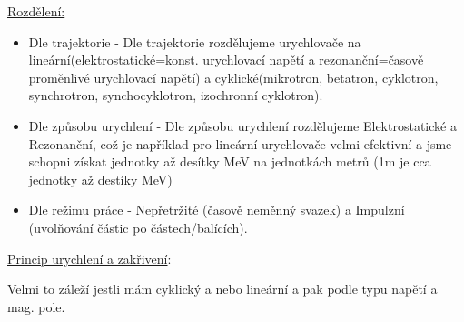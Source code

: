 \underline{Rozdělení:}

\begin{itemize}
    \item Dle trajektorie - Dle trajektorie rozdělujeme urychlovače na lineární(elektrostatické=konst. urychlovací napětí a rezonanční=časově proměnlivé urychlovací napětí) a cyklické(mikrotron, betatron, cyklotron, synchrotron, synchocyklotron, izochronní cyklotron).

    \item Dle způsobu urychlení - Dle způsobu urychlení rozdělujeme Elektrostatické a Rezonanční, což je například pro lineární urychlovače velmi efektivní a jsme schopni získat jednotky až desítky MeV na jednotkách metrů (1m je cca jednotky až destíky MeV)

    \item Dle režimu práce - Nepřetržité (časově neměnný svazek) a Impulzní (uvolňování částic po částech/balících).
\end{itemize}

\underline{Princip urychlení a zakřivení}:

Velmi to záleží jestli mám cyklický a nebo lineární a pak podle typu napětí a mag. pole.

